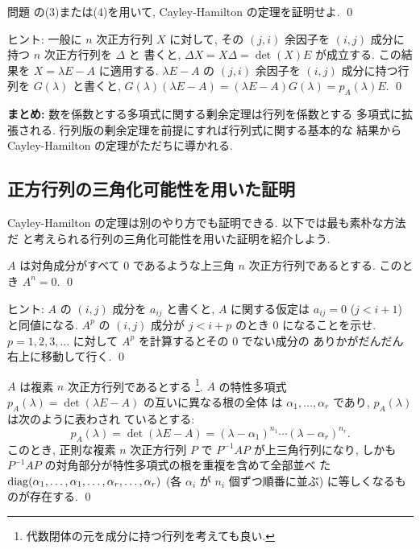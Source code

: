\documentclass[12pt,twoside]{jarticle}
\begin{document}

\begin{question}[15点]
  問題  の(3)または(4)を用いて, 
  Cayley-Hamilton の定理を証明せよ. \qed
\end{question}

\noindent
ヒント: 一般に $n$ 次正方行列 $X$ に対して,
その $(j,i)$ 余因子を $(i,j)$ 成分に持つ $n$ 次正方行列を $\Delta$ と
書くと, $\Delta X = X \Delta = \det(X)E$ が成立する.  
この結果を $X = \lambda E - A$ に適用する.  $\lambda E - A$ 
の $(j,i)$ 余因子を $(i,j)$ 成分に持つ行列を $G(\lambda)$ と書くと, 
$G(\lambda)(\lambda E - A) = (\lambda E - A)G(\lambda) = p_A(\lambda) E$.
\qed

\bigskip
\noindent
{\large {\bf まとめ:} 数を係数とする多項式に関する剰余定理は行列を係数とする
  多項式に拡張される.  行列版の剰余定理を前提にすれば行列式に関する基本的な
  結果から Cayley-Hamilton の定理がただちに導かれる.}


\subsection{正方行列の三角化可能性を用いた証明}
\label{sec:CH-triangulation}

Cayley-Hamilton の定理は別のやり方でも証明できる.  以下では最も素朴な方法だ
と考えられる行列の三角化可能性を用いた証明を紹介しよう.

\begin{question}[10点]
\label{q:nilpotent-matrix}
  $A$ は対角成分がすべて $0$ であるような上三角 $n$ 次正方行列であるとする.
  このとき $A^n=0$.
  \qed
\end{question}

\noindent
ヒント: $A$ の $(i,j)$ 成分を $a_{ij}$ と書くと, 
$A$ に関する仮定は $a_{ij}=0$ ($j<i+1$) と同値になる.
$A^p$ の $(i,j)$ 成分が $j<i+p$ のとき $0$ になることを示せ.
$p=1,2,3,\ldots$ に対して $A^p$ を計算するとその $0$ でない成分の
ありかがだんだん右上に移動して行く.
\qed


\begin{question}[複素正方行列の三角化可能性, 20点]
\label{q:triangularizable2}
  $A$ は複素 $n$ 次正方行列であるとする%
  \footnote{代数閉体の元を成分に持つ行列を考えても良い.}.  %
  $A$ の特性多項式 $p_A(\lambda)=\det(\lambda E - A)$ の互いに異なる根の全体
  は $\alpha_1,\ldots,\alpha_r$ であり, $p_A(\lambda)$ は次のように表わされ
  ているとする:
  \begin{equation*}
    p_A(\lambda)=\det(\lambda E - A)
    = (\lambda-\alpha_1)^{n_1}\cdots(\lambda-\alpha_r)^{n_r}.
  \end{equation*}
  このとき, 正則な複素 $n$ 次正方行列 $P$ で $P^{-1}AP$ が上三角行列になり, 
  しかも $P^{-1}AP$ の対角部分が特性多項式の根を重複を含めて全部並べ
  た $\mathop{\mathrm{diag}}\nolimits(\alpha_1,\dots,\alpha_1,\dots,\alpha_r,\dots,\alpha_r)$ 
  (各 $\alpha_i$ が $n_i$ 個ずつ順番に並ぶ) に等しくなるものが存在する.
  \qed
\end{question}
\end{document}
